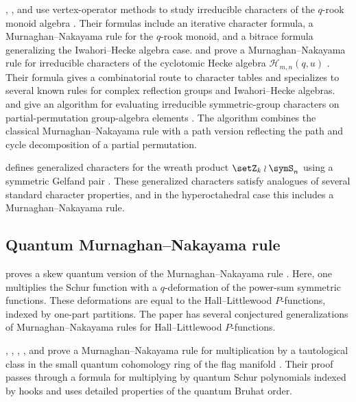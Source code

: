 , , and  use vertex-operator
methods to study irreducible characters of the $q$-rook monoid algebra
\cite{JingWuLiu2025}.  Their formulas include an iterative character formula,
a Murnaghan--Nakayama rule for the $q$-rook monoid, and a bitrace formula
generalizing the Iwahori--Hecke algebra case.
 and  prove a Murnaghan--Nakayama rule for
irreducible characters of the cyclotomic Hecke algebra
$\mathscr H_{m,n}(q,u)$ \cite{JingLiu2025x}.  Their formula gives a
combinatorial route to character tables and specializes to several known
rules for complex reflection groups and Iwahori--Hecke algebras.
 and  give an algorithm for
evaluating irreducible symmetric-group characters on partial-permutation
group-algebra elements \cite{HamakerRhoades2025x}.  The algorithm combines
the classical Murnaghan--Nakayama rule with a path version reflecting the path
and cycle decomposition of a partial permutation.

 defines generalized characters for the wreath product
$\setZ_k \wr \symS_n$ using a symmetric Gelfand pair
\cite{Tout2022x}.  These generalized characters satisfy analogues of several
standard character properties, and in the hyperoctahedral case this includes a
Murnaghan--Nakayama rule.


\subsection[quantumMNRule]{Quantum Murnaghan--Nakayama rule}

 proves a skew quantum version
of the Murnaghan--Nakayama rule \cite{Konvalinka2011x}.  Here, one
multiplies the Schur function with a $q$-deformation of the power-sum
symmetric functions.  These deformations are equal to
the Hall--Littlewood $P$-functions, indexed by one-part partitions.
The paper has several conjectured generalizations of Murnaghan--Nakayama
rules for Hall--Littlewood $P$-functions.

, ,
, , and 
prove a Murnaghan--Nakayama rule for multiplication by a tautological class in
the small quantum cohomology ring of the flag manifold
\cite{BenedettiVelasquezBergeronColmenarejoSaliolaSottile2025}.  Their proof
passes through a formula for multiplying by quantum Schur polynomials indexed
by hooks and uses detailed properties of the quantum Bruhat order.


